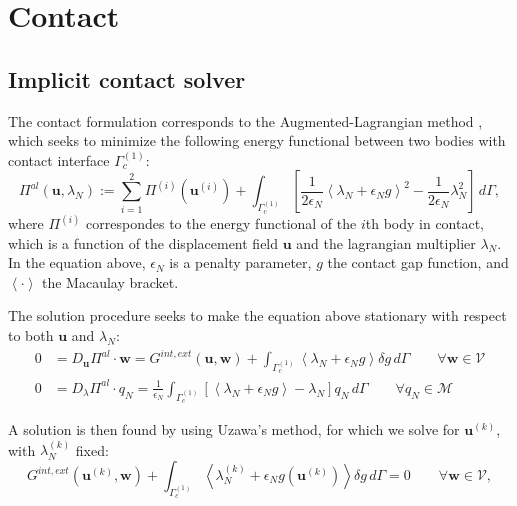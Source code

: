 

\chapter{Contact}

\section{Implicit contact solver}

The contact formulation corresponds to the Augmented-Lagrangian method \cite{Laursen:2002}, which seeks to minimize the following energy functional between two bodies with contact interface $ \Gamma_c^{\left( 1 \right)} $: 
\begin{equation} \label{eq:functinal} 
  \Pi^{al} \left( \boldsymbol u, \lambda_N \right) := \sum_{i=1}^2 \Pi ^{\left( i \right) } ( \boldsymbol u ^{\left( i \right) }  ) + \int_{\Gamma_c^{\left( 1 \right) } } \left[ \frac{1}{2 \epsilon_N } \left< \lambda_N + \epsilon_N g \right>^ 2 - \frac{1}{2 \epsilon_N} \lambda^2_N \right] \, d\Gamma,
\end{equation}
where $ \Pi^{\left( i \right) } $ correspondes to the energy functional of the $ i $th body in contact, which is a function of the displacement field $\boldsymbol u$ and the lagrangian multiplier $\lambda_N$. In the equation above, $\epsilon_N$ is a penalty parameter,  $g$ the contact gap function, and $\left< \cdot \right>$ the Macaulay bracket.

The solution procedure seeks to make the equation above stationary with respect to both $\boldsymbol u$ and $\lambda_N$:
\begin{equation}
\begin{aligned}
 0 &= D_{\boldsymbol u} \Pi^{al} \cdot \boldsymbol w = G^{int,ext} \left( \boldsymbol u, \boldsymbol w \right) + \int_{\Gamma_c^{\left( 1 \right) } } \left< \lambda_N + \epsilon_N g \right> \delta g  \, d\Gamma  \qquad  \forall \boldsymbol w \in \mathcal{V} \\
0 &= D_{ \lambda} \Pi^{al} \cdot q_N  = \frac{1}{\epsilon_N} \int_{\Gamma_c^{\left( 1 \right) } } \left[ \left< \lambda_N + \epsilon_N g \right> - \lambda_N \right] q_N  \, d\Gamma  \qquad  \forall q_N \in \mathcal{M}
\end{aligned}
\end{equation}

A solution is then found by using Uzawa's method, for which we solve for $ \boldsymbol u ^ {\left( k \right) }$, with $ \lambda_N^{\left( k \right)}$ fixed:
\begin{equation}
 G^{int,ext} ( \boldsymbol u ^ {\left( k \right) }, \boldsymbol w ) + \int_{\Gamma_c^{\left( 1 \right) } } \left< \lambda_N^ {\left( k \right) } + \epsilon_N g( \boldsymbol u ^ {\left( k \right) } )  \right> \delta g  \, d\Gamma = 0 \qquad \forall \boldsymbol w \in \mathcal{V},
 \end{equation}

